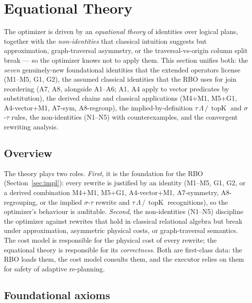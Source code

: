 \documentclass[acmsmall,review,anonymous]{acmart}
\theoremstyle{plain}
\theoremstyle{definition}
\newcommand{\topK}{\operatorname{topK}}
\theoremstyle{remark}
\begin{document}
\section{Equational Theory}\label{sec:equational}

The optimizer is driven by an \emph{equational theory} of identities
over logical plans, together with the \emph{non-identities} that
classical intuition suggests but approximation, graph-traversal
asymmetry, or the traversal-vs-origin column split break --- so the
optimizer knows not to apply them. This section unifies both: the
\emph{seven} genuinely-new foundational identities that the extended
operators license (M1--M5, G1, G2), the assumed classical identities
that the RBO uses for join reordering (A7, A8, alongside
A1--A6; A1, A4 apply to vector predicates by substitution), the
derived chains and classical applications (M4+M1, M5+G1,
A4-vector+M1, A7-sym, A8-regroup), the implied-by-definition
$\tau\,\Lambda\,/\,\topK$ and $\sigma$-$\tau$ rules, the
non-identities (N1--N5) with counterexamples, and the convergent
rewriting analysis.

\subsection{Overview}\label{sec:equational:overview}

The theory plays two roles. \emph{First}, it is the foundation for
the RBO (Section~\ref{sec:impl}): every rewrite is justified by an
identity (M1--M5, G1, G2, or a derived combination M4+M1,
M5+G1, A4-vector+M1, A7-symmetry, A8-regrouping, or the implied
$\sigma$-$\tau$ rewrite and $\tau\,\Lambda\,/\,\topK$
recognitions), so the optimizer's behaviour is auditable.
\emph{Second}, the non-identities (N1--N5) discipline the
optimizer against rewrites that hold in classical relational
algebra but break under approximation, asymmetric physical costs,
or graph-traversal semantics. The cost model is responsible for the
physical cost of every rewrite; the equational theory is responsible
for its \emph{correctness}. Both are first-class data: the RBO loads
them, the cost model consults them, and the executor relies on them
for safety of adaptive re-planning.

\subsection{Foundational axioms}\label{sec:equational:foundational}
\end{document}
